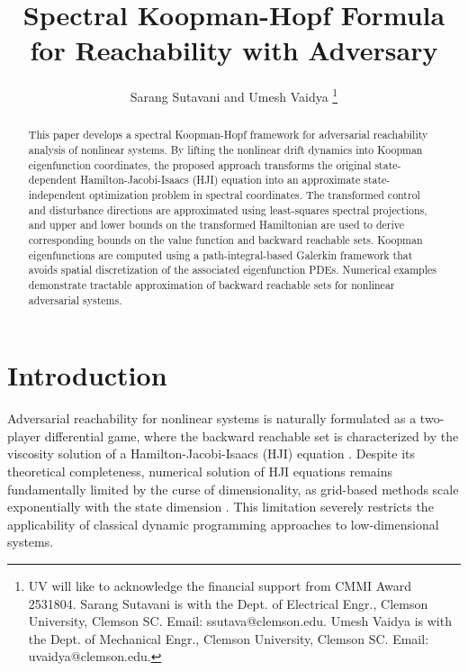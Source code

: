 \documentclass[letterpaper, 10 pt, conference]{ieeeconf}
\title{\LARGE Spectral Koopman-Hopf Formula  for Reachability with Adversary}
\author{Sarang Sutavani and Umesh Vaidya%
\thanks{UV will like to acknowledge the financial support from CMMI Award 2531804. Sarang Sutavani is with the Dept. of Electrical Engr., Clemson University, Clemson SC. Email: ssutava@clemson.edu. Umesh Vaidya is with the Dept. of Mechanical Engr., Clemson University, Clemson SC. Email: uvaidya@clemson.edu. 
}
}
\theoremstyle{plain}
\theoremstyle{definition}
\begin{document}
\maketitle
\thispagestyle{empty}
\pagestyle{empty}






\begin{abstract}
This paper develops a spectral Koopman-Hopf framework for adversarial reachability analysis of nonlinear systems. By lifting the nonlinear drift dynamics into Koopman eigenfunction coordinates, the proposed approach transforms the original state-dependent Hamilton-Jacobi-Isaacs (HJI) equation into an approximate state-independent optimization problem in spectral coordinates. The transformed control and disturbance directions are approximated using least-squares spectral projections, and upper and lower bounds on the transformed Hamiltonian are used to derive corresponding bounds on the value function and backward reachable sets. Koopman eigenfunctions are computed using a path-integral-based Galerkin framework that avoids spatial discretization of the associated eigenfunction PDEs. Numerical examples demonstrate tractable approximation of backward reachable sets for nonlinear adversarial systems.
\end{abstract}








\section{Introduction}


Adversarial reachability for nonlinear systems is naturally formulated as a two-player differential game, where the backward reachable set is characterized by the viscosity solution of a Hamilton-Jacobi-Isaacs (HJI) equation \cite{bardi1997optimal}. Despite its theoretical completeness, numerical solution of HJI equations remains fundamentally limited by the curse of dimensionality, as grid-based methods scale exponentially with the state dimension \cite{mitchell2005time, mitchell2007comparing}. This limitation severely restricts the applicability of classical dynamic programming approaches to low-dimensional systems.
\end{document}
